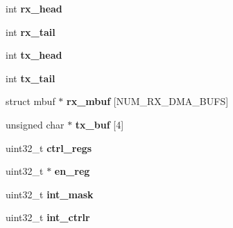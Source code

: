 \begin{DoxyCompactItemize}
\item 
\mbox{\label{structau1x00__emac__softc__t_a3cf3e766db8f82242a75ab6fd88c867b}} 
int {\bfseries rx\+\_\+head}
\item 
\mbox{\label{structau1x00__emac__softc__t_ad0243883b0e2005b0fb8de44b8991b84}} 
int {\bfseries rx\+\_\+tail}
\item 
\mbox{\label{structau1x00__emac__softc__t_af277f3eae45f139551bd2440ebae5930}} 
int {\bfseries tx\+\_\+head}
\item 
\mbox{\label{structau1x00__emac__softc__t_a02d61769eb24ce188afb6ba8c38c1755}} 
int {\bfseries tx\+\_\+tail}
\item 
\mbox{\label{structau1x00__emac__softc__t_a1a32f1fe9ebdf820d1a50da59cccb65d}} 
struct mbuf $\ast$ {\bfseries rx\+\_\+mbuf} \mbox{[}N\+U\+M\+\_\+\+R\+X\+\_\+\+D\+M\+A\+\_\+\+B\+U\+FS\mbox{]}
\item 
\mbox{\label{structau1x00__emac__softc__t_a0940d06503f3f1c168d8f3517139bef8}} 
unsigned char $\ast$ {\bfseries tx\+\_\+buf} \mbox{[}4\mbox{]}
\item 
\mbox{\label{structau1x00__emac__softc__t_a03c3bfa44b819d9034df1aa959a8a6ea}} 
uint32\+\_\+t {\bfseries ctrl\+\_\+regs}
\item 
\mbox{\label{structau1x00__emac__softc__t_a3cc7fd2aa8e9f894c5630bf7c37fba0c}} 
uint32\+\_\+t $\ast$ {\bfseries en\+\_\+reg}
\item 
\mbox{\label{structau1x00__emac__softc__t_ae5bd2d8216f6e0d46683b9d7d7164978}} 
uint32\+\_\+t {\bfseries int\+\_\+mask}
\item 
\mbox{\label{structau1x00__emac__softc__t_a779b0c453e632a95bd22cceec6760249}} 
uint32\+\_\+t {\bfseries int\+\_\+ctrlr}
\item 
\mbox{\label{structau1x00__emac__softc__t_a68861536d736c2353b105c079e06e0f0}} 

\end{DoxyCompactItemize}
